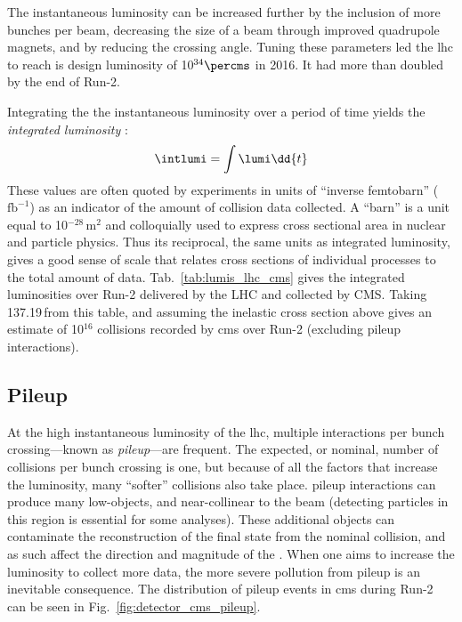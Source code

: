 
The instantaneous luminosity can be increased further by the inclusion of more bunches per beam, decreasing the size of a beam through improved quadrupole magnets, and by reducing the crossing angle. Tuning these parameters led the \acrshort{lhc} to reach is design luminosity of 10$^{34}\percms$ in 2016. It had more than doubled by the end of Run-2.

Integrating the the instantaneous luminosity over a period of time yields the \emph{integrated luminosity} \intlumi:
\begin{equation}
    \intlumi = \int \lumi \dd{t}
    \label{eq:lumi_integrated}
\end{equation}
These values are often quoted by experiments in units of ``inverse femtobarn'' ($\text{fb}^{-1}$) as an indicator of the amount of collision data collected. A ``barn'' is a unit equal to 10$^{-28}$\,m$^2$ and colloquially used to express cross sectional area in nuclear and particle physics. Thus its reciprocal, the same units as integrated luminosity, gives a good sense of scale that relates cross sections of individual processes to the total amount of data. Tab.~\ref{tab:lumis_lhc_cms} gives the integrated luminosities over Run-2 delivered by the LHC and collected by CMS. Taking 137.19\,\fbinv from this table, and assuming the inelastic \pp cross section above gives an estimate of 10$^{16}$ collisions recorded by \acrshort{cms} over Run-2 (excluding \gls{pileup} interactions).




\subsection{Pileup}
\label{subsec:pileup}

At the high instantaneous luminosity of the \acrshort{lhc}, multiple interactions per bunch crossing---known as \emph{\gls{pileup}}---are frequent. The expected, or nominal, number of collisions per bunch crossing is one, but because of all the factors that increase the luminosity, many ``softer'' collisions also take place. \Gls{pileup} interactions can produce many low-\pt objects, and near-collinear to the beam (detecting particles in this region is essential for some analyses). These additional objects can contaminate the reconstruction of the final state from the nominal collision, and as such affect the direction and magnitude of the \ptvecmiss. When one aims to increase the luminosity to collect more data, the more severe pollution from \gls{pileup} is an inevitable consequence. The distribution of \gls{pileup} events in \acrshort{cms} during Run-2 can be seen in Fig.~\ref{fig:detector_cms_pileup}.

